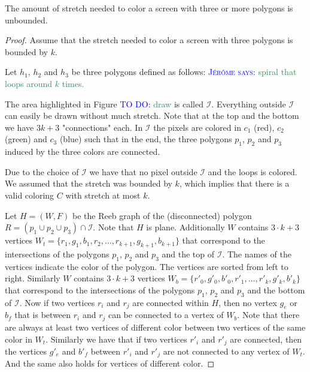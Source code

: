 \documentclass[a4paper, UKenglish]{lipics-v2018}
\newcommand{\mremark}[3]{\textcolor{blue}{\textsc{#1 #2:}} \textcolor{SeaGreen}{\textsf{#3}}}
\newcommand{\jerome}[2][says]{\mremark{J\'er\^ome}{#1}{#2}}
\newcommand{\todo}[2][DO]{\mremark{TO}{#1}{#2}}
\newcommand{\draw}{\todo{draw}}
\newcommand{\spg}{\mathcal{S\!P}}
\newcommand{\ixi}{\mathcal{I}}
\begin{document}
\begin{theorem}\label{thm:unbouded}
The amount of stretch needed to color a screen with three or more polygons is unbounded.
\end{theorem}
\begin{proof}
Assume that the stretch needed to color a screen with three polygons is bounded by $k$.

Let $h_1$, $h_2$ and $h_3$ be three polygons defined as follows:
\jerome{spiral that loops around $k$ times.}

The area highlighted in Figure \todo{draw} is called $\ixi$.
Everything outside $\ixi$ can easily be drawn without much stretch.
Note that at the top and the bottom we have $3k+3$ "connections" each. In $\ixi$ the pixels are colored in $c_1$ (red), $c_2$ (green) and $c_3$ (blue) such that in the end, the three polygons $p_1$, $p_2$ and $p_3$ induced by the three colors are connected.


Due to the choice of $\ixi$ we have that no pixel outside $\ixi$ and the loops is colored.
We assumed that the stretch was bounded by $k$, which implies that there is a valid coloring $C$ with stretch at most $k$.

Let $H=(W, F)$ be the Reeb graph of the (disconnected) polygon $R=(p_1\cup p_2\cup p_3)\cap \ixi$.
Note that $H$ is plane. Additionally $W$ contains $3\cdot k + 3$ vertices $W_t=\{r_1, g_1, b_1, r_2,\dots, r_{k+1}, g_{k+1}, b_{k+1}\}$ that correspond to the intersections of the polygons $p_1$, $p_2$ and $p_3$ and the top of $\ixi$. The names of the vertices indicate the color of the polygon. The vertices are sorted from left to right.
Similarly $W$ contains $3\cdot k + 3$ vertices $W_b=\textbf{}\{r'_0, g'_0, b'_0, r'_1,\dots, r'_k, g'_k, b'_k\}$ that correspond to the intersections of the polygons $p_1$, $p_2$ and $p_3$ and the bottom of $\ixi$.
Now if two vertices $r_i$ and $r_j$ are connected within $H$, then no vertex $g_e$ or $b_f$ that is between $r_i$ and $r_j$ can be connected to a vertex of $W_b$. Note that there are always at least two vertices of different color between two vertices of the same color in $W_t$.
Similarly we have that if two vertices $r'_i$ and $r'_j$ are connected, then the vertices $g'_e$ and $b'_f$ between $r'_i$ and $r'_j$ are not connected to any vertex of $W_t$.
And the same also holds for vertices of different color.


\end{proof}
\end{document}
